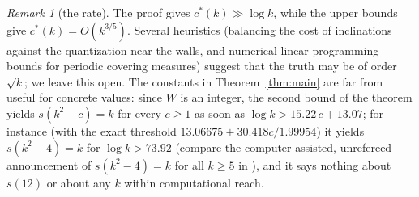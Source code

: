 \documentclass[11pt]{amsart}
\theoremstyle{definition}
\theoremstyle{remark}
\newtheorem{remark}[theorem]{Remark}
\begin{document}
\begin{remark}[the rate]
The proof gives $c^*(k)\gg\log k$, while the upper bounds give $c^*(k)=O(k^{3/5})$. Several heuristics (balancing the
cost of inclinations against the quantization near the walls, and numerical linear-programming bounds for
periodic covering measures) suggest that the truth may be of order $\sqrt k$; we leave this open. The constants in
Theorem~\ref{thm:main} are far from useful for concrete values: since $W$ is an integer, the second bound of the theorem yields
$s(k^2-c)=k$ for every $c\ge1$ as soon as $\log k>15.22\,c+13.07$; for instance (with the exact threshold $13.06675+30.418c/1.99954$) it yields $s(k^2-4)=k$ for $\log k>73.92$ (compare the computer-assisted, unrefereed announcement of $s(k^2-4)=k$ for all
$k\ge5$ in \cite{Dan}), and it says nothing
about $s(12)$ or about any $k$ within computational reach.
\end{remark}
\end{document}
